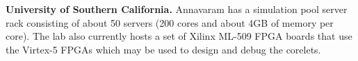 \vspace{3pt}
\noindent
\textbf{University of Southern California.}
Annavaram has a simulation pool server rack consisting of about 50 servers (200 cores and about 4GB of memory per core). 
The lab also currently hosts a set of Xilinx ML-509 FPGA boards that use the Virtex-5 FPGAs which may be used to design and debug the corelets. 
